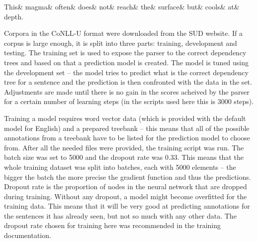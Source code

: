 \begin{adjustwidth}{-70pt}{50pt}
\begin{exe}
	\ex
	\label{ex:conllu}
	\begin{dependency}
	\begin{deptext}[column sep=0.4cm]
	This\& magma\& often\& does\& not\& reach\& the\& surface\& but\& cools\& at\& depth.\\
	 \end{deptext} 
	\end{dependency}
	
	
\end{exe}
\end{adjustwidth}
\vspace{.5cm}

Corpora in the CoNLL-U format were downloaded from the SUD website. If a corpus is large enough, it is split into three parts: training, development and testing. The training set is used to expose the parser to the correct dependency trees and based on that a prediction model is created. The model is tuned using the development set -- the model tries to predict what is the correct dependency tree for a sentence and the prediction is then confronted with the data in the set. Adjustments are made until there is no gain in the scores acheived by the parser for a certain number of learning steps (in the scripts used here this is 3000 steps). 

Training a model requires word vector data (which is provided with the default model for English) and a prepared treebank -- this means that all of the possible annotations from a treebank have to be listed for the prediction model to choose from. After all the needed files were provided, the training script was run. The batch size was set to 5000 and the dropout rate was 0.33. This means that the whole training dataset was split into batches, each with 5000 elements -- the bigger the batch the more precise the gradient function and thus the predictions. Dropout rate is the proportion of nodes in the neural network that are dropped during training. Without any dropout, a model might become overfitted for the training data. This means that it will be very good at predicting annotations for the sentences it has already seen, but not so much with any other data. The dropout rate chosen for training here was recommended in the training documentation.

